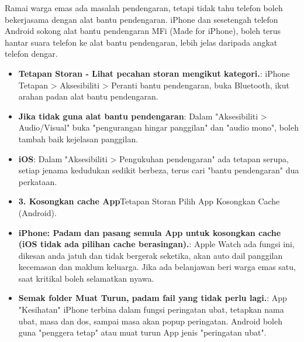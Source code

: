 
Ramai warga emas ada masalah pendengaran, tetapi tidak tahu telefon boleh bekerjasama dengan alat bantu pendengaran. iPhone dan sesetengah telefon Android sokong alat bantu pendengaran MFi (Made for iPhone), boleh terus hantar suara telefon ke alat bantu pendengaran, lebih jelas daripada angkat telefon dengar.

\begin{itemize}
  \item \textbf{Tetapan Storan ‑ Lihat pecahan storan mengikut kategori.}: iPhone Tetapan > Aksesibiliti > Peranti bantu pendengaran, buka Bluetooth, ikut arahan padan alat bantu pendengaran.
  \item \textbf{Jika tidak guna alat bantu pendengaran}: Dalam "Aksesibiliti > Audio/Visual" buka "pengurangan hingar panggilan" dan "audio mono", boleh tambah baik kejelasan panggilan.
  \item \textbf{iOS}: Dalam "Aksesibiliti > Pengukuhan pendengaran" ada tetapan serupa, setiap jenama kedudukan sedikit berbeza, terus cari "bantu pendengaran" dua perkataan.
\end{itemize}


\begin{itemize}
  \item \textbf{3. Kosongkan cache App}Tetapan Storan Pilih App Kosongkan Cache (Android).
  \item \textbf{iPhone: Padam dan pasang semula App untuk kosongkan cache (iOS tidak ada pilihan cache berasingan).}: Apple Watch ada fungsi ini, dikesan anda jatuh dan tidak bergerak seketika, akan auto dail panggilan kecemasan dan maklum keluarga. Jika ada belanjawan beri warga emas satu, saat kritikal boleh selamatkan nyawa.
  \item \textbf{Semak folder Muat Turun, padam fail yang tidak perlu lagi.}: App "Kesihatan" iPhone terbina dalam fungsi peringatan ubat, tetapkan nama ubat, masa dan dos, sampai masa akan popup peringatan. Android boleh guna "penggera tetap" atau muat turun App jenis "peringatan ubat".
\end{itemize}

